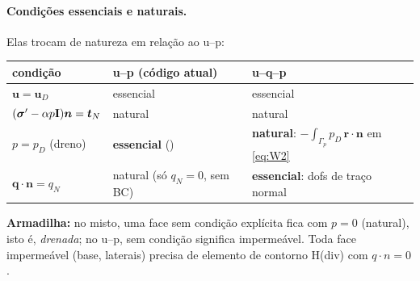 \documentclass[11pt,a4paper]{article}
\newcommand{\cc}[1]{\texttt{\detokenize{#1}}}
\newcommand{\bu}{\boldsymbol{u}}\newcommand{\bq}{\boldsymbol{q}}\newcommand{\bv}{\boldsymbol{v}}
\newcommand{\br}{\boldsymbol{r}}\newcommand{\bn}{\boldsymbol{n}}\newcommand{\bb}{\boldsymbol{b}}
\newcommand{\Id}{\mathbf{I}}\newcommand{\Div}{\nabla\!\cdot}
\begin{document}
\paragraph{Condições essenciais e naturais.} Elas trocam de natureza em relação ao u--p:
\begin{center}\small
\begin{tabular}{lll}
\toprule
condição & u--p (código atual) & u--q--p\\\midrule
$\bu=\bu_D$ & essencial & essencial\\
$(\bsig'-\alpha p\Id)\bn=\bt_N$ & natural & natural\\
$p=p_D$ (dreno) & \textbf{essencial} (\cc{EDirichletP}) & \textbf{natural}: $-\int_{\Gamma_p}p_D\,\br\cdot\bn$ em \eqref{eq:W2}\\
$\bq\cdot\bn=q_N$ & natural (só $q_N=0$, sem BC) & \textbf{essencial}: dofs de traço normal\\\bottomrule
\end{tabular}
\end{center}
\textbf{Armadilha:} no misto, uma face sem condição explícita fica com $p=0$ (natural), isto é, \emph{drenada}; no u--p, sem condição
significa impermeável. Toda face impermeável (base, laterais) precisa de elemento de contorno H(div) com $q\cdot n=0$.

\end{document}
